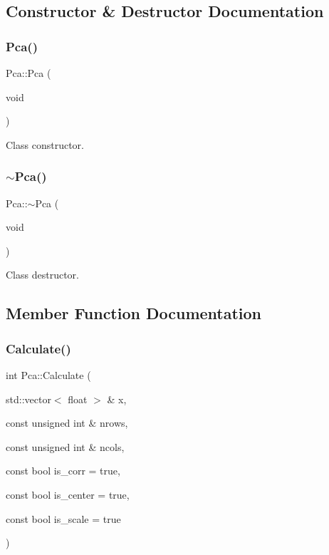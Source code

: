 \subsection{Constructor \& Destructor Documentation}
\hypertarget{classPca_ac8f42fb6ce69fb1a3a85c99d6b49204c}{}\label{classPca_ac8f42fb6ce69fb1a3a85c99d6b49204c} 
\subsubsection{\texorpdfstring{Pca()}{Pca()}}
{\footnotesize\ttfamily Pca\+::\+Pca (\begin{DoxyParamCaption}\item[{void}]{ }\end{DoxyParamCaption})}



Class constructor. 

\hypertarget{classPca_a900858e8760079d51bff8fd267f551ce}{}\label{classPca_a900858e8760079d51bff8fd267f551ce} 
\subsubsection{\texorpdfstring{$\sim$\+Pca()}{~Pca()}}
{\footnotesize\ttfamily Pca\+::$\sim$\+Pca (\begin{DoxyParamCaption}\item[{void}]{ }\end{DoxyParamCaption})}



Class destructor. 



\subsection{Member Function Documentation}
\hypertarget{classPca_a69bab38091166e75c71a20952c4c9ef4}{}\label{classPca_a69bab38091166e75c71a20952c4c9ef4} 
\subsubsection{\texorpdfstring{Calculate()}{Calculate()}}
{\footnotesize\ttfamily int Pca\+::\+Calculate (\begin{DoxyParamCaption}\item[{std\+::vector$<$ float $>$ \&}]{x,  }\item[{const unsigned int \&}]{nrows,  }\item[{const unsigned int \&}]{ncols,  }\item[{const bool}]{is\+\_\+corr = {\ttfamily true},  }\item[{const bool}]{is\+\_\+center = {\ttfamily true},  }\item[{const bool}]{is\+\_\+scale = {\ttfamily true} }\end{DoxyParamCaption})}



